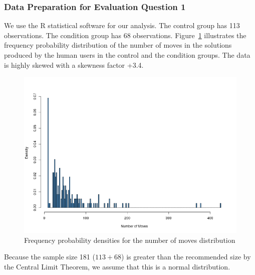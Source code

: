 \subsubsection{Data Preparation for Evaluation Question 1}
We use the R statistical software for our analysis.
The control group has 113 observations.
The condition group has 68 observations.
Figure~\ref{fig:fullhisto} illustrates the frequency probability distribution of the number of moves in the solutions produced by the human users in the control and the condition groups. 
The data is highly skewed with a skewness factor +3.4.
\begin{figure}[tpb]
  \centering
\includegraphics[width=0.8\columnwidth]{img/histo_length.png}
  \caption{Frequency probability densities for the number of moves distribution}
  \label{fig:fullhisto}
\end{figure}
Because the sample size 181 ($113+68$) is greater than the recommended size by the Central Limit Theorem, we assume that this is a normal distribution.
%

